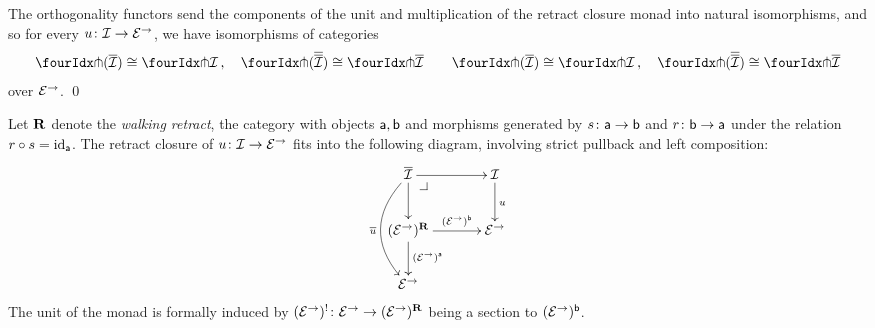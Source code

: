\documentclass[reqno,10pt,a4paper,oneside]{amsart}
\begin{document}
\begin{proposition}
\label{retract-closure}
The orthogonality functors send the components of the unit and multiplication of the retract closure monad into natural
isomorphisms, and so for every $u \colon \mathcal{I} \to \mathcal{E}^\to$, we have isomorphisms of categories
\begin{gather*} 
 \liftr{(\overline{\cal{I}})} \iso \liftr{\cal{I}} \, , \quad
 \liftr{(\overline{\overline{\cal{I}}})} \iso \liftr{\overline{\cal{I}}}  \qquad
 \liftl{(\overline{\cal{I}})} \iso \liftl{\cal{I}} \, , \quad
 \liftl{(\overline{\overline{\cal{I}}})} \iso \liftl{\overline{\cal{I}}}
\end{gather*} 
over $\mathcal{E}^\to$. \qed
\end{proposition}




\begin{remark} Let $\mathbf{R}$ denote the \emph{walking retract}, \ie the category with objects $\mathsf{a}, \mathsf{b}$ and morphisms generated by $s \colon \mathsf{a} \to \mathsf{b}$ and $r \colon \mathsf{b} \to \mathsf{a}$ under the relation $r \mathbin{\circ} s = \operatorname{id}_{\mathsf{a}}$. The retract closure of $u \colon \mathcal{I} \to \mathcal{E}^\to$ fits into the following diagram, involving strict pullback and left composition:
\[
\xymatrix@C+1em{
  \overline{\cal{I}}
  \ar[r]
  \ar[d]
  \ar@/_2em/[dd]_{\overline{u}}
  \pullback{dr}
&
  \cal{I}
  \ar[d]^{u}
\\
  (\catE^{\to})^{\ret}
  \ar[r]^-{(\catE^{\to})^{\retB}}
  \ar[d]^{(\catE^{\to})^{\retA}}
&
  \catE^{\to}
\\
  \catE^{\to}
}
\]
The unit of the monad is formally induced by $(\mathcal{E}^{\to})^{\mathord{!}} \colon \mathcal{E}^{\to} \to (\mathcal{E}^{\to})^{\mathbf{R}}$ being a section to $(\mathcal{E}^{\to})^{\mathsf{b}}$.
\end{remark}
\end{document}
